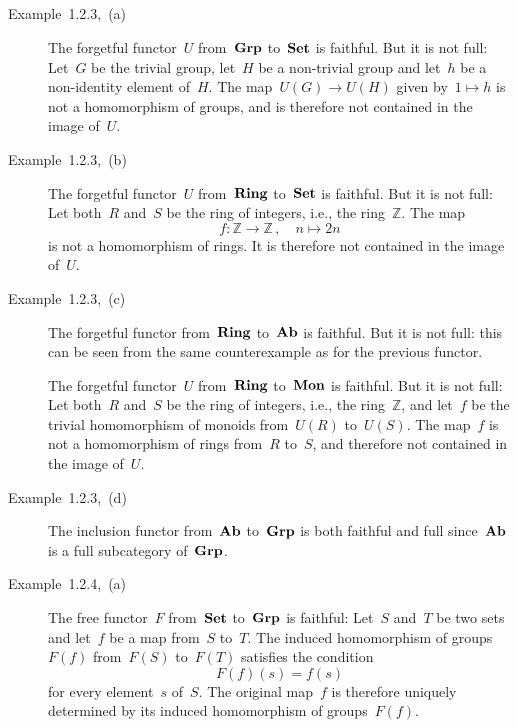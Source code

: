 \subsection{}



\subsubsection{}

\begin{description}
	
	\item[Example~1.2.3,~(a)]
		The forgetful functor~$U$ from~$\mathbf{Grp}$ to~$\mathbf{Set}$ is faithful.
		But it is not full:
		Let~$G$ be the trivial group, let~$H$ be a non-trivial group and let~$h$ be a non-identity element of~$H$.
		The map~$U(G) \to U(H)$ given by~$1 \mapsto h$ is not a homomorphism of groups, and is therefore not contained in the image of~$U$.

	\item[Example~1.2.3,~(b)]
		The forgetful functor~$U$ from~$\mathbf{Ring}$ to~$\mathbf{Set}$ is faithful.
		But it is not full:
		Let both~$R$ and~$S$ be the ring of integers, i.e., the ring~$ℤ$.
		The map
		\[
			f
			\colon
			ℤ \to ℤ \,,
			\quad
			n \mapsto 2n
		\]
		is not a homomorphism of rings.
		It is therefore not contained in the image of~$U$.

	\item[Example~1.2.3,~(c)]
		The forgetful functor from~$\mathbf{Ring}$ to~$\mathbf{Ab}$ is faithful.
		But it is not full:
		this can be seen from the same counterexample as for the previous functor.

		The forgetful functor~$U$ from~$\mathbf{Ring}$ to~$\mathbf{Mon}$ is faithful.
		But it is not full:
		Let both~$R$ and~$S$ be the ring of integers, i.e., the ring~$ℤ$, and let~$f$ be the trivial homomorphism of monoids from~$U(R)$ to~$U(S)$.
		The map~$f$ is not a homomorphism of rings from~$R$ to~$S$, and therefore not contained in the image of~$U$.

	\item[Example~1.2.3,~(d)]
		The inclusion functor from~$\mathbf{Ab}$ to~$\mathbf{Grp}$ is both faithful and full since~$\mathbf{Ab}$ is a full subcategory of~$\mathbf{Grp}$.

	\item[Example~1.2.4,~(a)]
		The free functor~$F$ from~$\mathbf{Set}$ to~$\mathbf{Grp}$ is faithful:
		Let~$S$ and~$T$ be two sets and let~$f$ be a map from~$S$ to~$T$.
		The induced homomorphism of groups~$F(f)$ from~$F(S)$ to~$F(T)$ satisfies the condition
		\[
			F(f)(s)
			=
			f(s)
		\]
		for every element~$s$ of~$S$.
		The original map~$f$ is therefore uniquely determined by its induced homomorphism of groups~$F(f)$.


\end{description}
